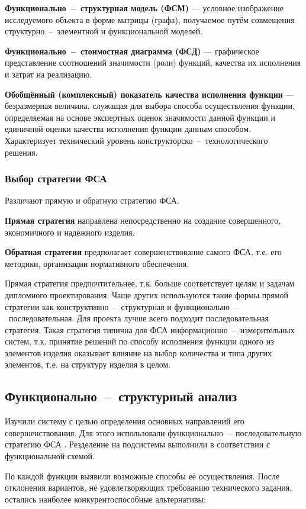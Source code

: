 \textbf{Функционально~--~структурная модель (ФСМ)} --- условное изображение
исследуемого объекта в форме матрицы (графа),
получаемое путём совмещения структурно~--~элементной и функциональной моделей.

\textbf{Функционально~--~стоимостная диаграмма (ФСД)} --- графическое
представление соотношений значимости (роли) функций, качества их
исполнения и затрат на реализацию.

\textbf{Обобщённый (комплексный) показатель качества исполнения функции}
--- безразмерная величина, служащая для выбора способа осуществления функции,
определяемая на основе экспертных оценок значимости данной функции и единичной
оценки качества исполнения функции данным способом.
Характеризует технический уровень конструкторско~--~технологического решения.

\subsubsection{Выбор стратегии ФСА}
Различают прямую и обратную стратегию ФСА.

\textbf{Прямая стратегия}
направлена непосредственно на создание совершенного, экономичного и надёжного
изделия.

\textbf{Обратная стратегия}
предполагает совершенствование самого ФСА, т.е. его методики, организации
нормативного обеспечения.

Прямая стратегия предпочтительнее, т.к. больше соответствует целям и задачам
дипломного проектирования.
Чаще других используются такие формы прямой стратегии как
конструктивно~--~структурная и функционально~--~последовательная.
Для проекта лучше всего подходит последовательная стратегия.
Такая стратегия типична для ФСА информационно~--~измерительных систем, т.к.
принятие решений по способу исполнения функции одного из элементов изделия
оказывает влияние на выбор количества и типа других элементов, т.е. на структуру
изделия в целом.

\newpage
\subsection{Функционально~--~структурный анализ}
Изучили систему с целью определения основных направлений его совершенствования.
Для этого использовали функционально~--~последовательную стратегию ФСА
\cite[стр. 11]{econ_FSA}.
Резделение на подсистемы выполнили в соответствии с функциональной схемой.

По каждой функции выявили возможные способы её осуществления.
После отклонения вариантов, не удовлетворяющих требованию технического
задания, остались наиболее конкурентоспособные альтернативы:

